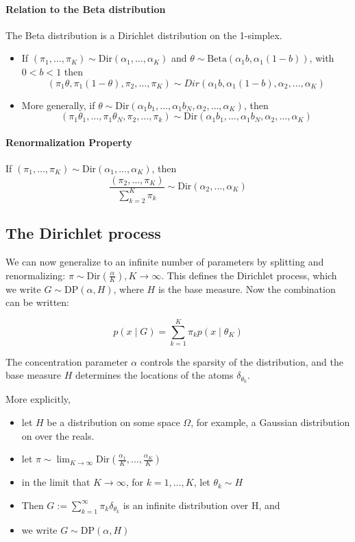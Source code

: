\documentclass[twoside]{article}
\newcommand{\Dir}{\mathrm{Dir}}
\newcommand{\Bet}{\mathrm{Beta}}
\newcommand{\DP}{\mathrm{DP}}
\begin{document}
\paragraph{Relation to the Beta distribution}
The Beta distribution is a Dirichlet distribution on the 1-simplex.
\begin{itemize}
\item If $(\pi_1,\ldots,\pi_K) \sim \Dir(\alpha_1,\ldots,\alpha_K)$ and $\theta \sim \Bet{(\alpha_1b,\alpha_1(1-b))}$, with $0 < b < 1$ then
\[ (\pi_1\theta,\pi_1(1-\theta),\pi_2,\ldots,\pi_K) \sim Dir{(\alpha_1 b,\alpha_1(1-b),\alpha_2,\ldots,\alpha_K)} \]
\item More generally, if $\theta \sim \Dir{(\alpha_1b_1,\ldots,\alpha_1b_N,\alpha_2,\ldots,\alpha_K)}$, then
\[ (\pi_1\theta_1,\ldots,\pi_1\theta_N,\pi_2,\ldots,\pi_k) \sim \Dir{(\alpha_1b_1,\ldots,\alpha_1b_N,\alpha_2,\ldots,\alpha_K)} \]
\end{itemize}


\paragraph{Renormalization Property}

If $(\pi_1,\ldots,\pi_K) \sim \Dir(\alpha_1,\ldots,\alpha_K)$, then
\[
\frac{(\pi_2,\ldots,\pi_K)}{\sum_{k=2}^K \pi_k} \sim \Dir(\alpha_2,\ldots,\alpha_K)
\]


\subsection{The Dirichlet process}
We can now generalize to an infinite number of parameters by splitting and renormalizing: $\pi \sim \Dir(\frac{\alpha}{K}), K \longrightarrow \infty$. This defines the Dirichlet process, which we write $G \sim \DP(\alpha, H)$, where $H$ is the base measure. Now the combination can be written:

$$ p(x \mid G) = \sum_{k=1}^K \pi_k p(x \mid \theta_K) $$

The concentration parameter $\alpha$ controls the sparsity of the distribution, and the base measure $H$ determines the locations of the atoms $\delta_{\theta_k}$.

More explicitly, 
\begin{itemize}
\item let $H$ be a distribution on some space $\Omega$, for example, a Gaussian distribution on over the reals.
\item let $\pi \sim \lim_{K \to \infty} \Dir{\left( \frac{\alpha_1}{K},\ldots,\frac{\alpha_K}{K} \right)}$
\item in the limit that $K \to \infty$, for $k = 1,\ldots,K$, let $\theta_k \sim H$
\item Then $G := \sum_{k=1}^{\infty}\pi_k \delta_{\theta_k}$ is an infinite distribution over H, and
\item we write $G \sim \DP{(\alpha,H)}$
\end{itemize}
\end{document}
